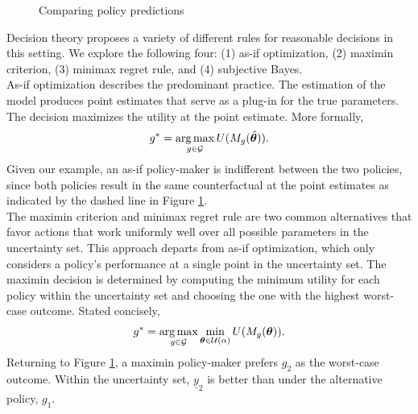 \begin{figure}[h!]\centering
{}
\caption{Comparing policy predictions}\label{Comparing policy predictions}
\end{figure}\FloatBarrier

\noindent Decision theory proposes a variety of different rules for reasonable decisions in this setting. We explore the following four: (1) as-if optimization, (2) maximin criterion, (3) minimax regret rule, and (4) subjective Bayes.\\

\noindent As-if optimization describes the predominant practice. The estimation of the model produces point estimates that serve as a plug-in for the true parameters. The decision maximizes the utility at the point estimate. More formally,
%
\begin{align*}
  g^* =\operatorname*{arg\,max}_{g \in \mathcal{G}} U(M_g(\hat{\bm{\theta}})).
\end{align*}
%
Given our example, an as-if policy-maker is indifferent between the two policies, since both policies result in the same counterfactual at the point estimates as indicated by the dashed line in Figure \ref{Comparing policy predictions}.\\

\noindent The maximin criterion and minimax regret rule are two common alternatives that favor actions that work uniformly well over all possible parameters in the uncertainty set. This approach departs from as-if optimization, which only considers a policy's performance at a single point in the uncertainty set. The maximin decision \citep{Gilboa.1989, Wald.1950} is determined by computing the minimum utility for each policy within the uncertainty set and choosing the one with the highest worst-case outcome. Stated concisely,
%
\begin{align*}
 g^* =\operatorname*{arg\,max}_{g \in \mathcal{G}}\min_{\bm{\theta} \in \mathcal{U}(\alpha)} U(M_g(\bm{\theta})).
\end{align*}
%
\noindent Returning to Figure \ref{Comparing policy predictions}, a maximin policy-maker prefers $g_2$ as the worst-case outcome. Within the uncertainty set, $\underline{y}_2$ is better than under the alternative policy, $g_1$.\\

